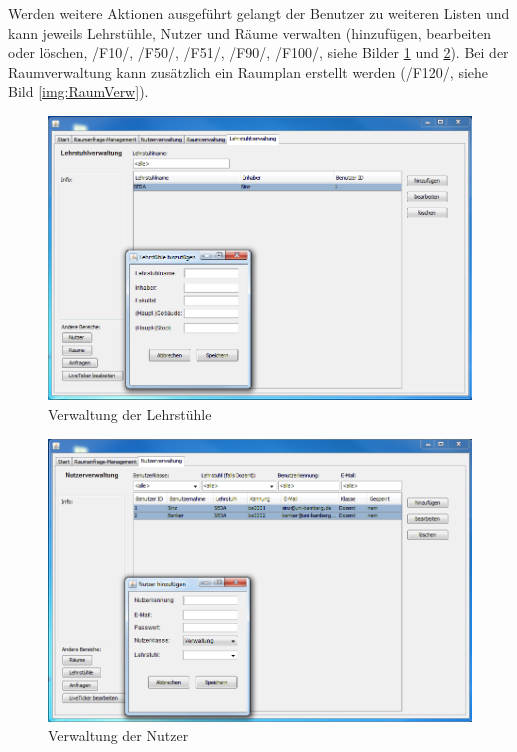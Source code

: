 Werden weitere Aktionen ausgeführt gelangt der Benutzer zu weiteren Listen und kann jeweils Lehrstühle, Nutzer und Räume verwalten (hinzufügen, bearbeiten oder löschen, /F10/, /F50/, /F51/, /F90/, /F100/, siehe Bilder \ref{img:LehrstuhlVerw} und \ref{img:NutzerVerw}). Bei der Raumverwaltung kann zusätzlich ein Raumplan erstellt werden (/F120/, siehe Bild \ref{img:RaumVerw}).
\begin{figure}[H]
\begin{center}
\includegraphics[width=150mm]{images/section_7/VerwaltungLehrstuhlverwaltung.PNG}
\caption{Verwaltung der Lehrstühle}
\label{img:LehrstuhlVerw}
\end{center}
\end{figure}

\begin{figure}[H]
\begin{center}
\includegraphics[width=150mm]{images/section_7/VerwaltungNutzerverwaltung.PNG}
\caption{Verwaltung der Nutzer}
\label{img:NutzerVerw}
\end{center}
\end{figure}

